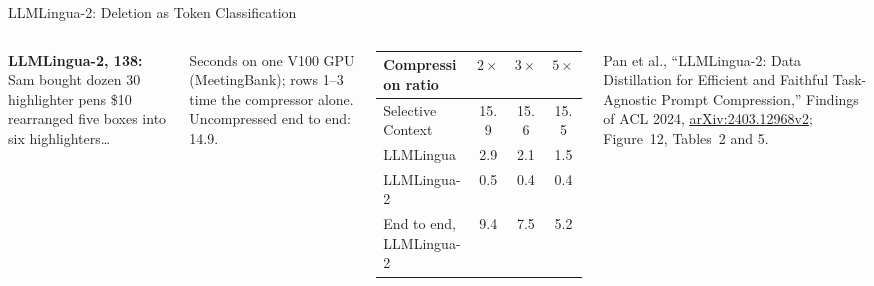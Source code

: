 \begin{frame}{LLMLingua-2: Deletion as Token Classification}
\begin{columns}[T,onlytextwidth]
\begin{tcolorbox}[colframe=gray!60, colback=gray!6, boxrule=0.4pt, left=3pt, right=3pt, top=2pt, bottom=2pt]
        \textbf{LLMLingua-2, 138:} Sam bought dozen 30 highlighter pens \$10 rearranged five boxes into six highlighters\ldots
      \end{tcolorbox}
      \vspace{0.2em}
      {\scriptsize Seconds on one V100 GPU (MeetingBank); rows 1--3 time the compressor alone. Uncompressed end to end: 14.9.\par}
      \vspace{0.1em}
      {\centering\scriptsize\setlength{\tabcolsep}{4pt}
      \begin{tabular}{lccc}
        \toprule
        \textbf{Compression ratio} & $2\times$ & $3\times$ & $5\times$ \\
        \midrule
        Selective Context & 15.9 & 15.6 & 15.5 \\
        LLMLingua & 2.9 & 2.1 & 1.5 \\
        LLMLingua-2 & 0.5 & 0.4 & 0.4 \\
        \addlinespace[0.2em]
        End to end, LLMLingua-2 & 9.4 & 7.5 & 5.2 \\
        \bottomrule
      \end{tabular}\par}
      \vspace{0.3em}
      {\scriptsize Pan et al., ``LLMLingua-2: Data Distillation for Efficient and Faithful Task-Agnostic Prompt Compression,'' Findings of ACL 2024, \href{https://arxiv.org/abs/2403.12968v2}{arXiv:2403.12968v2}; Figure~12, Tables~2 and 5.\par}
  \end{columns}
\end{frame}

